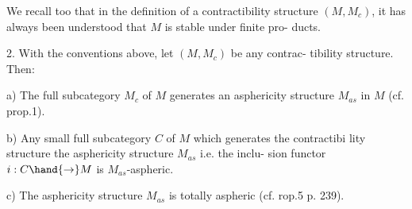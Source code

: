 We recall too that in the definition of a contractibility structure
$(M,M_c)$, it has always been understood that $M$ is stable under finite pro-%
ducts.

\hand{\uline{\textcolor{black}{Proposition}}} 2. With the conventions above, let $(M,M_c)$ be any contrac-%
tibility structure. Then:

a) The full subcategory $M_c$ of $M$ generates an asphericity structure
$M_{as}$ in $M$ (cf. prop.1).

b) Any small full subcategory $C$ of $M$ which generates the contractibi
lity structure \hand{\uline{\textcolor{black}{generates}}} the asphericity structure $M_{as}$\hand{,} i.e. the inclu-%
sion functor $i: C \hand{\to} M$ is $M_{as}$-aspheric.

c) The asphericity structure $M_{as}$ is totally aspheric (cf. rop.5
p. 239).


